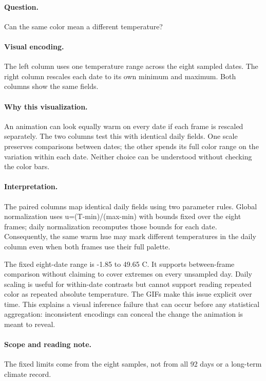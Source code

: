 \documentclass[conference,a4paper]{IEEEtran}
\begin{document}
\paragraph{Question.} Can the same color mean a different temperature?



\paragraph{Visual encoding.} The left column uses one temperature range across the eight sampled dates. The right column rescales each date to its own minimum and maximum. Both columns show the same fields.



\paragraph{Why this visualization.} An animation can look equally warm on every date if each frame is rescaled separately. The two columns test this with identical daily fields. One scale preserves comparisons between dates; the other spends its full color range on the variation within each date. Neither choice can be understood without checking the color bars.



\paragraph{Interpretation.} The paired columns map identical daily fields using two parameter rules. Global normalization uses u=(T-min)/(max-min) with bounds fixed over the eight frames; daily normalization recomputes those bounds for each date. Consequently, the same warm hue may mark different temperatures in the daily column even when both frames use their full palette.

The fixed eight-date range is -1.85 to 49.65 C. It supports between-frame comparison without claiming to cover extremes on every unsampled day. Daily scaling is useful for within-date contrasts but cannot support reading repeated color as repeated absolute temperature. The GIFs make this issue explicit over time. This explains a visual inference failure that can occur before any statistical aggregation: inconsistent encodings can conceal the change the animation is meant to reveal.



\paragraph{Scope and reading note.} The fixed limits come from the eight samples, not from all 92 days or a long-term climate record.
\end{document}
